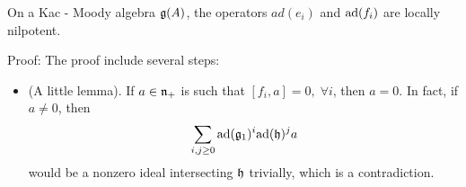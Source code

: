 \begin{dang}
    \begin{lemma}
        On a Kac - Moody algebra $\mathfrak{g}(A)$, the operators $ad(e_i)$ and $\text{ad}(f_i)$ are 
        locally nilpotent.
    \end{lemma}
\end{dang}
Proof: The proof include several steps:
\begin{itemize}
    \item(A little lemma). If $a\in\mathfrak{n}_+$ is such that $[f_i,a]=0,\;\forall i$, then $a = 0$. In fact, if $a\neq0$, then 
    \begin{equation}
         \sum_{i,j\geq0} \text{ad}(\mathfrak{g}_1)^{i}\text{ad}(\mathfrak{h})^ja
    \end{equation}
    would be a nonzero ideal intersecting $\mathfrak{h}$ trivially, which is a contradiction.


\end{itemize}
